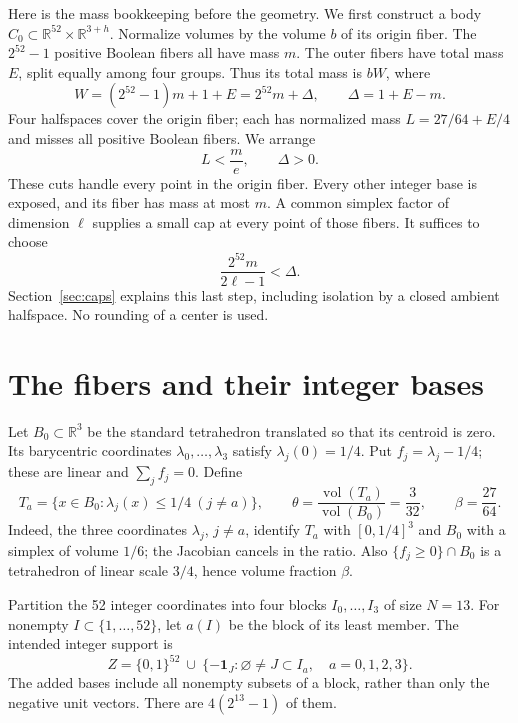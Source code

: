 \documentclass[11pt]{article}
\newcommand{\R}{\mathbb R}
\newcommand{\vol}{\operatorname{vol}}
\newcommand{\one}{\mathbf 1}
\begin{document}
Here is the mass bookkeeping before the geometry. We first construct a
body $C_0\subset\R^{52}\times\R^{3+h}$. Normalize volumes by the volume
$b$ of its origin fiber. The $2^{52}-1$ positive Boolean fibers all have
mass $m$. The outer fibers have total mass $E$, split equally among four
groups. Thus its total mass is $bW$, where
\begin{equation}\label{eq:W}
 W=(2^{52}-1)m+1+E=2^{52}m+\Delta,\qquad \Delta=1+E-m.
\end{equation}
Four halfspaces cover the origin fiber; each has normalized mass
$L=27/64+E/4$ and misses all positive Boolean fibers. We arrange
\begin{equation}\label{eq:twotests}
 L<\frac m e,\qquad \Delta>0.
\end{equation}
These cuts handle every point in the origin fiber. Every other integer
base is exposed, and its fiber has mass at most $m$. A common simplex
factor of dimension $\ell$ supplies a small cap at every point of those
fibers. It suffices to choose
\begin{equation}\label{eq:paddingtest}
 \frac{2^{52}m}{2\ell-1}<\Delta.
\end{equation}
Section~\ref{sec:caps} explains this last step, including isolation by a
closed ambient halfspace. No rounding of a center is used.

\section{The fibers and their integer bases}
Let $B_0\subset\R^3$ be the standard tetrahedron translated so that its
centroid is zero. Its barycentric coordinates $\lambda_0,\ldots,\lambda_3$
satisfy $\lambda_j(0)=1/4$. Put $f_j=\lambda_j-1/4$; these are linear
and $\sum_j f_j=0$. Define
\[
 T_a=\{x\in B_0:\lambda_j(x)\le1/4\ (j\ne a)\},\qquad
 \theta=\frac{\vol(T_a)}{\vol(B_0)}=\frac3{32},\qquad \beta=\frac{27}{64}.
\]
Indeed, the three coordinates $\lambda_j$, $j\ne a$, identify $T_a$
with $[0,1/4]^3$ and $B_0$ with a simplex of volume $1/6$; the Jacobian
cancels in the ratio. Also $\{f_j\ge0\}\cap B_0$ is a tetrahedron of
linear scale $3/4$, hence volume fraction $\beta$.

Partition the 52 integer coordinates into four blocks $I_0,\ldots,I_3$
of size $N=13$. For nonempty $I\subset\{1,\ldots,52\}$, let $a(I)$ be
the block of its least member. The intended integer support is
\begin{equation}\label{eq:support}
 Z=\{0,1\}^{52}\ \cup\
 \{-\one_J:\varnothing\ne J\subset I_a,\quad a=0,1,2,3\}.
\end{equation}
The added bases include all nonempty subsets of a block, rather than only
the negative unit vectors. There are $4(2^{13}-1)$ of them.
\end{document}
